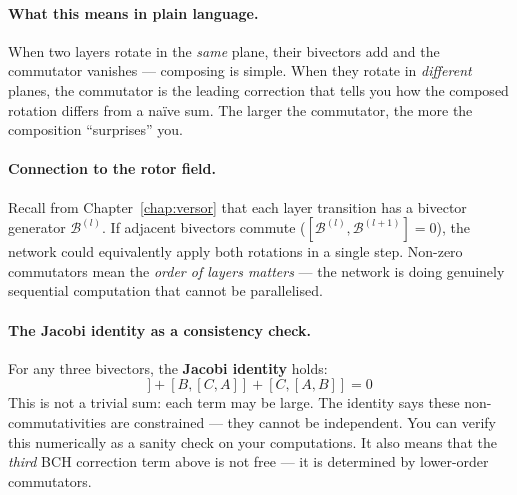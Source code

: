 \documentclass[11pt, twoside, openright]{memoir}
\newcommand{\bivec}[1]{\mathcal{B}^{(#1)}}  %
\numberwithin{equation}{chapter}
\begin{document}
\paragraph{What this means in plain language.}
When two layers rotate in the \emph{same} plane, their bivectors add
and the commutator vanishes --- composing is simple.  When they rotate
in \emph{different} planes, the commutator is the leading correction
that tells you how the composed rotation differs from a na\"ive sum.
The larger the commutator, the more the composition ``surprises'' you.

\paragraph{Connection to the rotor field.}
Recall from Chapter~\ref{chap:versor} that each layer transition has
a bivector generator $\bivec{l}$.  If adjacent bivectors commute
($[\bivec{l}, \bivec{l+1}] = 0$), the network could equivalently apply
both rotations in a single step.  Non-zero commutators mean the
\emph{order of layers matters} --- the network is doing genuinely
sequential computation that cannot be parallelised.

\paragraph{The Jacobi identity as a consistency check.}
For any three bivectors, the \textbf{Jacobi identity} holds:
\begin{equation}
  [A, [B, C]] + [B, [C, A]] + [C, [A, B]] = 0
\end{equation}
This is not a trivial sum: each term may be large.  The identity says
these non-commutativities are constrained --- they cannot be
independent.  You can verify this numerically as a sanity check on
your computations.  It also means that the \emph{third} BCH correction
term above is not free --- it is determined by lower-order commutators.
\end{document}
